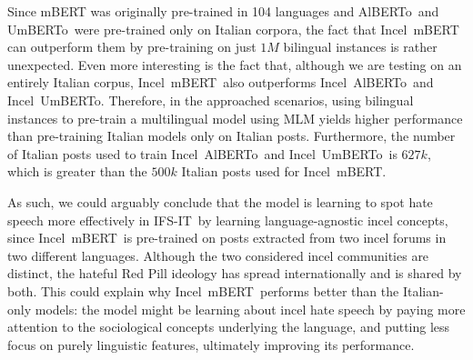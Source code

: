 \documentclass[11pt]{article}
\newcommand{\todoP}[1]{\todo[color=red]{P: #1}}
\newcommand{\dsITclassification}{IFS-IT}
\newcommand{\imbert}{\mbox{Incel mBERT}}
\newcommand{\umbert}{\mbox{UmBERTo}}
\newcommand{\albert}{\mbox{AlBERTo}}
\newcommand{\iumbert}{\mbox{Incel UmBERTo}}
\newcommand{\ialbert}{\mbox{Incel AlBERTo}}
\begin{document}
Since mBERT was originally pre-trained in 104 languages and \albert\, and \umbert\, were pre-trained only on Italian corpora, the fact that \imbert\, can outperform them by pre-training on just $1M$ bilingual instances is rather unexpected.
Even more interesting is the fact that, although we are testing on an entirely Italian corpus, \imbert\, also outperforms \ialbert\, and \iumbert. Therefore, in the approached scenarios, using bilingual instances to pre-train a multilingual model using MLM yields higher performance than pre-training Italian models only on Italian posts. Furthermore, the number of Italian posts used to train \ialbert\, and \iumbert\, is $627k$, which is greater than the $500k$ Italian posts used for \imbert.

As such, we could arguably conclude that the model is learning to spot hate speech more effectively in \dsITclassification\, by learning language-agnostic incel concepts, since \imbert\, is pre-trained on posts extracted from two incel forums in two different languages.
Although the two considered incel communities are distinct, the hateful Red Pill ideology has spread internationally and is shared by both. This could explain why \imbert\, performs better than the Italian-only models: the model might be learning about incel hate speech by paying more attention to the sociological concepts underlying the language, and putting less focus on purely linguistic features, ultimately improving its performance.


\end{document}

